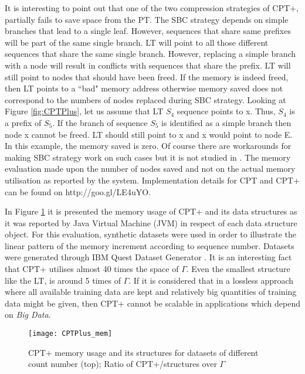 \par It is interesting to point out that one of the two compression strategies of CPT+, partially fails to save space from the PT. The SBC strategy depends on simple branches that lead to a single leaf. However, sequences that share same prefixes will be part of the same single branch. LT will point to all those different sequences that share the same single branch. However, replacing a simple branch with a node will result in conflicts with sequences that share the prefix. LT will still point to nodes that should have been freed. If the memory is indeed freed, then LT points to a ``bad" memory address otherwise memory saved does not correspond to the numbers of nodes replaced during SBC strategy. Looking at Figure \ref{fig:CPTPlus}, let us assume that LT $S_4$ sequence points to x. Thus, $S_4$ is a prefix of $S_5$. If the branch of sequence $S_5$ is identified as a simple branch then node x cannot be freed. LT should still point to x and x would point to node E. In this example, the memory saved is zero. Of course there are workarounds for making SBC strategy work on such cases but it is not studied in . The memory evaluation made upon the number of nodes saved and not on the actual memory utilisation as reported by the system. Implementation details for CPT and CPT+ can be found on http://goo.gl/LE4uYO.
\par In Figure \ref{fig:CPT_mem} it is presented the memory usage of CPT+ and its data structures as it was reported by Java Virtual Machine (JVM) in respect of each data structure object. For this evaluation, synthetic datasets were used in order to illustrate the linear pattern of the memory increment according to sequence number. Datasets were generated through IBM Quest Dataset Generator \cite{spmf}. It is an interesting fact that CPT+ utilises almost 40 times the space of \(\Gamma\). Even the smallest structure like the LT, is around 5 times of \(\Gamma\). If it is considered that in a lossless approach where all available training data are kept and relatively big quantities of training data might be given, then CPT+ cannot be scalable in applications which depend on \emph{Big Data}. 


\begin{figure}[h]
    \centering
    \texttt{[image: CPTPlus\_mem]}
    \caption{CPT+ memory usage and its structures for datasets of different count number (top); Ratio of CPT+/structures over \(\Gamma\)}
    \label{fig:CPT_mem}
\end{figure}

